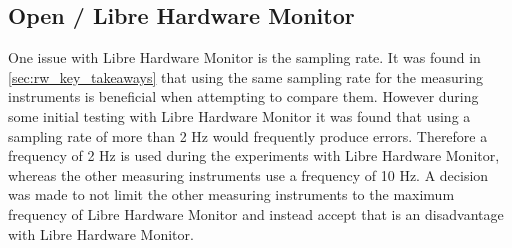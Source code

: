 
\subsection{Open / Libre Hardware Monitor}
One issue with Libre Hardware Monitor is the sampling rate. It was found in \cref{sec:rw_key_takeaways} that using the same sampling rate for the measuring instruments is beneficial when attempting to compare them. However during some initial testing with Libre Hardware Monitor it was found that using a sampling rate of more than 2 Hz would frequently produce errors. Therefore a frequency of 2 Hz is used during the experiments with Libre Hardware Monitor, whereas the other measuring instruments use a frequency of 10 Hz. A decision was made to not limit the other measuring instruments to the maximum frequency of Libre Hardware Monitor and instead accept that is an disadvantage with Libre Hardware Monitor.